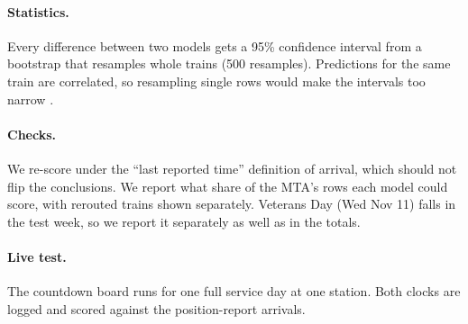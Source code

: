\documentclass[10pt,letterpaper,twocolumn]{article}
\begin{document}
\paragraph{Statistics.} Every difference between two models gets a 95\% confidence interval from a bootstrap that resamples whole trains (500 resamples). Predictions for the same train are correlated, so resampling single rows would make the intervals too narrow \citep{efron1993}.

\paragraph{Checks.} We re-score under the ``last reported time'' definition of arrival, which should not flip the conclusions. We report what share of the MTA's rows each model could score, with rerouted trains shown separately. Veterans Day (Wed Nov 11) falls in the test week, so we report it separately as well as in the totals.

\paragraph{Live test.} The countdown board runs for one full service day at one station. Both clocks are logged and scored against the position-report arrivals.

\nocite{*}


\end{document}
